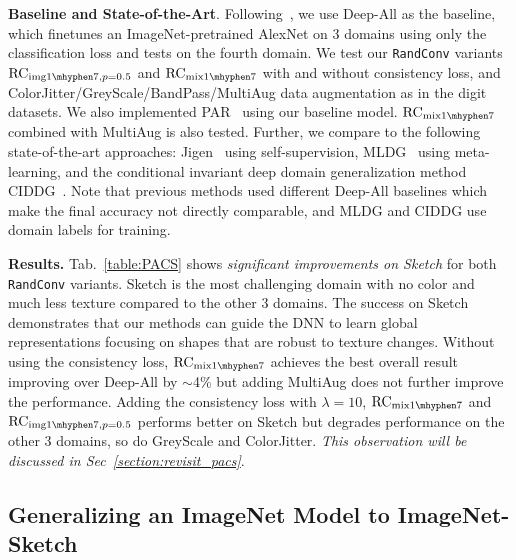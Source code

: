 \documentclass{article} \usepackage{iclr2021_conference,times}
\newcommand{\RandConv}{\texttt{RandConv}}
\begin{document}
\textbf{Baseline and State-of-the-Art}. Following~\citep{li2017deeper}, we use Deep-All as the baseline, which finetunes an ImageNet-pretrained AlexNet on 3 domains using only the classification loss and tests on the fourth domain. We test our {\RandConv} variants  $\text{RC}_{\text{img}{1\mhyphen7},p=0.5}$ and $\text{RC}_{\text{mix}{1\mhyphen7}}$ with and without consistency loss, and ColorJitter/GreyScale/{BandPass/MultiAug} data augmentation as in the digit datasets. We also implemented PAR~\citep{wang2019learning} using our baseline model. { $\text{RC}_{\text{mix}{1\mhyphen7}}$ combined with MultiAug is also tested.}
Further, we compare to the following state-of-the-art approaches: Jigen~\citep{carlucci2019jigen} using self-supervision, MLDG~\citep{li2018mldg} using meta-learning, 
and the conditional invariant deep domain generalization method CIDDG~\citep{li2018ciddg}. Note that {previous methods used different Deep-All baselines which make the final accuracy not directly comparable, and} MLDG and CIDDG use domain labels for training.

\textbf{Results.} Tab.~\ref{table:PACS} shows \emph{significant improvements on Sketch} for both {\RandConv} variants. Sketch is the most challenging domain with no color and much less texture compared to the other 3 domains. The success on Sketch demonstrates that our methods can guide the DNN to learn global representations focusing on shapes that are robust to texture changes. Without using the consistency loss, $\text{RC}_{\text{mix}{1\mhyphen7}}$ achieves the best overall result improving over Deep-All by $\sim$4\% {but adding MultiAug does not further improve the performance}.
Adding the consistency loss with $\lambda=10$, $\text{RC}_{\text{mix}{1\mhyphen7}}$ and $\text{RC}_{\text{img}{1\mhyphen7}, p=0.5}$ performs better on Sketch but degrades performance on the other 3 domains, so do GreyScale and ColorJitter. \textit{This observation will be discussed in Sec~\ref{section:revisit_pacs}}.



\subsection{{Generalizing an ImageNet Model to ImageNet-Sketch}}
\label{section:imagenet-sketch}
\end{document}
